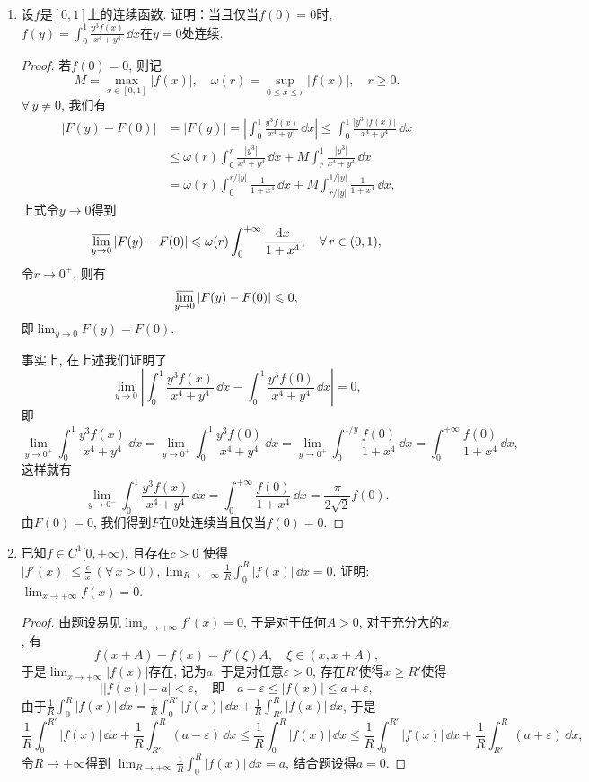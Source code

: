 \begin{quiza}
\begin{enumerate}
\item 设\(f\)是\([0,1]\)上的连续函数. 证明：当且仅当\(f(0)=0\)时, 
\(f(y)=\int_{0}^{1}\frac{y^3f(x)}{x^4+y^4}\,\dd x\)在\(y=0\)处连续.
\begin{proof}
若\(f(0)=0\), 则记\[M=\max_{x\in[0,1]}\left|f(x)\right|,\quad
\omega(r)=\sup_{0\leqslant x\leqslant r}\left|f(x)\right|,\quad r\geqslant 0.\]
\(\forall\, y\ne 0\), 我们有\[\begin{split}
|F(y)-F(0)|&=|F(y)|
=\left|\int_{0}^{1}\frac{y^3f(x)}{x^4+y^4}\,\dd x\right|
\leqslant\int_{0}^{1}\frac{|y^3||f(x)|}{x^4+y^4}\,\dd x\\
&\leqslant\omega(r)\int_{0}^{r}\frac{|y^3|}{x^4+y^4}\,\dd x
+M\int_{r}^{1}\frac{|y^3|}{x^4+y^4}\,\dd x\\
&=\omega(r)\int_{0}^{r/|y|}\frac{1}{1+x^4}\,\dd x
+M\int_{r/|y|}^{1/|y|}\frac{1}{1+x^4}\,\dd x,
\end{split}\]上式令\(y\rightarrow 0\)得到
\[\varlimsup_{y\rightarrow 0}|F(y)-F(0)|
\leqslant\omega(r)\int_{0}^{+\infty}\frac{\mathrm{d} x}{1+x^4},\quad\forall\, r\in (0,1),\]
令\(r\rightarrow 0^+\), 则有
\[\varlimsup_{y\rightarrow 0}|F(y)-F(0)|\leqslant 0,\]
即\(\lim_{y\rightarrow 0}F(y)=F(0).\)

事实上, 在上述我们证明了
\[\lim_{y\rightarrow 0}\left|\int_{0}^{1}\frac{y^3f(x)}{x^4+y^4}\,\dd x
-\int_{0}^{1}\frac{y^3f(0)}{x^4+y^4}\,\dd x\right|=0,\]
即\[\lim_{y\rightarrow 0^+}\int_{0}^{1}\frac{y^3f(x)}{x^4+y^4}\,\dd x
=\lim_{y\rightarrow 0^+}\int_{0}^{1}\frac{y^3f(0)}{x^4+y^4}\,\dd x
=\lim_{y\rightarrow 0^+}\int_{0}^{1/y}\frac{f(0)}{1+x^4}\,\dd x
=\int_{0}^{+\infty}\frac{f(0)}{1+x^4}\,\dd x,\]
这样就有\[\lim_{y\rightarrow 0^-}\int_{0}^{1}\frac{y^3f(x)}{x^4+y^4}\,\dd x
=\int_{0}^{+\infty}\frac{f(0)}{1+x^4}\,\dd x=\frac{\pi}{2\sqrt{2}}f(0).\]
由\(F(0)=0\), 我们得到\(F\)在\(0\)处连续当且仅当\(f(0)=0\).
\end{proof}

\item 已知\(f\in C^1[0,+\infty)\), 且存在\(c>0\)
使得\(|f'(x)|\leqslant\frac{c}{x}\ (\forall\, x>0),
\lim_{R\rightarrow+\infty}\frac{1}{R}\int_{0}^{R}|f(x)|\,\dd x=0\). 
证明: \(\lim_{x\rightarrow+\infty}f(x)=0\).
\begin{proof}
由题设易见\(\lim_{x\rightarrow+\infty}f'(x)=0\), 
于是对于任何\(A>0\), 对于充分大的\(x\), 有
\[f(x+A)-f(x)=f'(\xi)A,\quad \xi\in(x,x+A),\]
于是\(\lim_{x\rightarrow+\infty}|f(x)|\)存在, 记为\(a\). 
于是对任意\(\varepsilon>0\), 存在\(R'\)使得\(x\geqslant R'\)使得
\[\left||f(x)|-a\right|<\varepsilon,\quad\text{即}\quad a-\varepsilon\leqslant |f(x)|\leqslant a+\varepsilon,\]
由于\(\frac{1}{R}\int_{0}^{R}|f(x)|\,\dd x
=\frac{1}{R}\int_{0}^{R'}|f(x)|\,\dd x+\frac{1}{R}\int_{R'}^{R}|f(x)|\,\dd x\), 于是
\[\frac{1}{R}\int_{0}^{R'}|f(x)|\,\dd x
+\frac{1}{R}\int_{R'}^{R}(a-\varepsilon)\,\dd x
\leqslant\frac{1}{R}\int_{0}^{R}|f(x)|\,\dd x
\leqslant\frac{1}{R}\int_{0}^{R'}|f(x)|\,\dd x
+\frac{1}{R}\int_{R'}^{R}(a+\varepsilon)\,\dd x,\]
令\(R\rightarrow+\infty\)得到
\(\lim_{R\rightarrow+\infty}\frac{1}{R}\int_{0}^{R}|f(x)|\,\dd x=a\), 
结合题设得\(a=0\).
\end{proof}


\end{enumerate}
\end{quiza}

